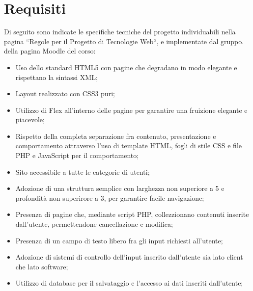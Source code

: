 \section{Requisiti}

Di seguito sono indicate le specifiche tecniche del progetto individuabili nella pagina ``Regole per il Progetto di Tecnologie Web``, e implementate dal gruppo.
della pagina Moodle del corso:
\begin{itemize}
    \item Uso dello standard HTML5 con pagine che degradano in modo elegante e rispettano la sintassi XML;
    \item Layout realizzato con CSS3 puri;
    \item Utilizzo di Flex all'interno delle pagine per garantire una fruizione elegante e piacevole;
    \item Rispetto della completa separazione fra contenuto, presentazione e comportamento attraverso l'uso di template HTML, fogli di stile CSS e file PHP e JavaScript per il comportamento;
    \item Sito accessibile a tutte le categorie di utenti;
    \item Adozione di una struttura semplice con larghezza non superiore a 5 e profondità non superirore a 3, per garantire facile navigazione;
    \item Presenza di pagine che, mediante script PHP, collezzionano contenuti inserite dall'utente, permettendone cancellazione e modifica;
    \item Presenza di un campo di testo libero fra gli input richiesti all'utente;
    \item Adozione di sistemi di controllo dell'input inserito dall'utente sia lato client che lato software;
    \item Utilizzo di database per il salvataggio e l'accesso ai dati inseriti dall'utente;
\end{itemize}